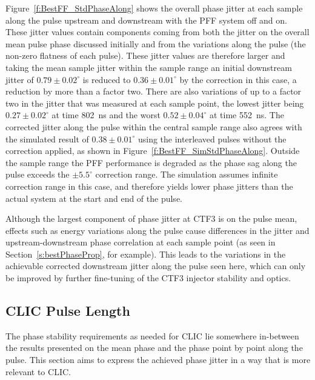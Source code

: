 Figure~\ref{f:BestFF_StdPhaseAlong} shows the overall phase jitter at each sample along the pulse upstream and downstream with the PFF system off and on. These jitter values contain components coming from both the jitter on the overall mean pulse phase discussed initially and from the variations along the pulse (the non-zero flatness of each pulse). These jitter values are therefore larger and taking the mean sample jitter within the sample range an initial downstream jitter of \(0.79\pm0.02^\circ\) is reduced to \(0.36\pm0.01^\circ\) by the correction in this case, a reduction by more than a factor two. There are also variations of up to a factor two in the jitter that was measured at each sample point, the lowest jitter being \(0.27\pm0.02^\circ\) at time 802~ns and the worst \(0.52\pm0.04^\circ\) at time 552~ns. The corrected jitter along the pulse within the central sample range also agrees with the simulated result of \(0.38\pm0.01^\circ\) using the interleaved pulses without the correction applied, as shown in Figure~\ref{f:BestFF_SimStdPhaseAlong}. Outside the sample range the PFF performance is degraded as the phase sag along the pulse exceeds the \(\pm5.5^\circ\) correction range. The simulation assumes infinite correction range in this case, and therefore yields lower phase jitters than the actual system at the start and end of the pulse.


Although the largest component of phase jitter at CTF3 is on the pulse mean, effects such as energy variations along the pulse cause differences in the jitter and upstream-downstream phase correlation at each sample point (as seen in Section~\ref{s:bestPhaseProp}, for example). This leads to the variations in the achievable corrected downstream jitter along the pulse seen here, which can only be improved by further fine-tuning of the CTF3 injector stability and optics.

\subsection{CLIC Pulse Length}
\label{ss:jitterCLICPulse}

The phase stability requirements as needed for CLIC lie somewhere in-between the results presented
on the mean phase and the phase point by point along the pulse. This section aims to express the achieved phase jitter in a way that is more relevant to CLIC.

